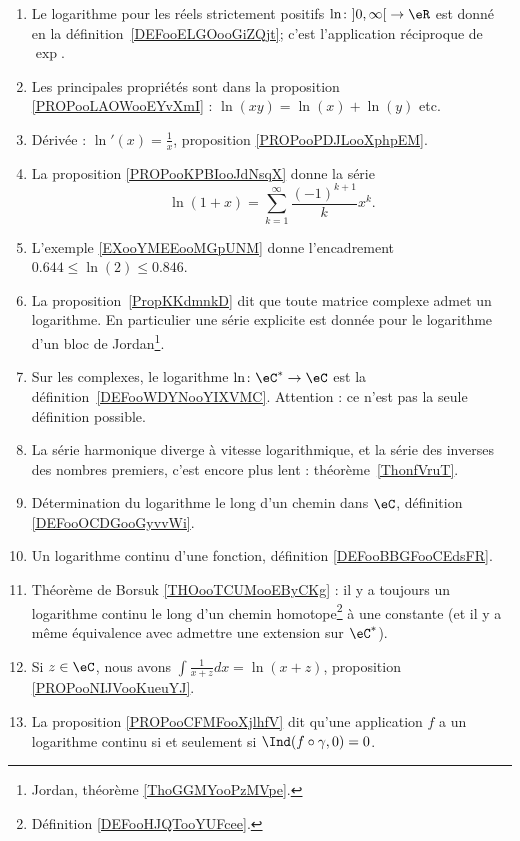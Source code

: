 	\label{THEMEooLogarithme}
\begin{enumerate}
	\item
	      Le logarithme pour les réels strictement positifs \( \ln\colon \mathopen] 0 , \infty \mathclose[\to \eR\) est donné en la définition~\ref{DEFooELGOooGiZQjt}; c'est l'application réciproque de \( \exp\).
	\item
	      Les principales propriétés sont dans la proposition \ref{PROPooLAOWooEYvXmI} : \( \ln(xy)=\ln(x)+\ln(y)\) etc.
	\item
	      Dérivée : \( \ln'(x)=\frac{1}{ x }\), proposition \ref{PROPooPDJLooXphpEM}.
	\item
	      La proposition \ref{PROPooKPBIooJdNsqX} donne la série
	      \begin{equation}
		      \ln(1+x)=\sum_{k=1}^{\infty}\frac{ (-1)^{k+1} }{ k }x^k.
	      \end{equation}
	\item
	      L'exemple \ref{EXooYMEEooMGpUNM} donne l'encadrement \( 0.644\leq \ln(2)\leq 0.846\).
	\item
	      La proposition~\ref{PropKKdmnkD} dit que toute matrice complexe admet un logarithme. En particulier une série explicite est donnée pour le logarithme d'un bloc de Jordan\footnote{Jordan, théorème \ref{ThoGGMYooPzMVpe}.}.
	\item
	      Sur les complexes, le logarithme \( \ln \colon \eC^*\to \eC\) est la définition~\ref{DEFooWDYNooYIXVMC}. Attention : ce n'est pas la seule définition possible.
	\item
	      La série harmonique diverge à vitesse logarithmique, et la série des inverses des nombres premiers, c'est encore plus lent : théorème~\ref{ThonfVruT}.
	\item
	      Détermination du logarithme le long d'un chemin dans \( \eC\), définition \ref{DEFooOCDGooGyvvWi}.
	\item
	      Un logarithme continu d'une fonction, définition \ref{DEFooBBGFooCEdsFR}.
	\item
	      Théorème de Borsuk \ref{THOooTCUMooEByCKg} : il y a toujours un logarithme continu le long d'un chemin homotope\footnote{Définition \ref{DEFooHJQTooYUFcee}.} à une constante (et il y a même équivalence avec admettre une extension sur \( \eC^*\)).
	\item
	      Si \( z\in \eC\), nous avons $\int\frac{1}{ x+z }dx=\ln(x+z)$, proposition \ref{PROPooNIJVooKueuYJ}.
	\item
	      La proposition \ref{PROPooCFMFooXjlhfV} dit qu'une application \( f\) a un logarithme continu si et seulement si \( \Ind(f\circ\gamma,0)=0\).
\end{enumerate}
